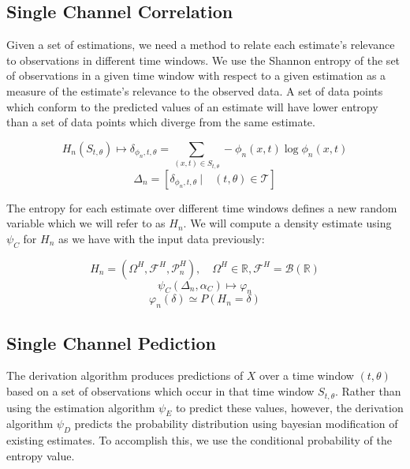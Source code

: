 \documentclass[10pt]{article}
\begin{document}
\subsection{Single Channel Correlation}


Given a set of estimations, we need a method to relate each estimate's relevance to observations in different time windows.  We use the Shannon entropy of the set of observations in a given time window with respect to a given estimation as a measure of the estimate's relevance to the observed data.  A set of data points which conform to the predicted values of an estimate will have lower entropy than a set of data points which diverge from the same estimate.

\begin{equation} \label{eq:HnSingle} H_n( S_{t,\theta} ) \mapsto \delta_{\phi_n,t,\theta} = \sum_{(x,t) \in S_{t,\theta}} -\phi_n(x,t) \log \phi_n(x,t) \end{equation}
\[ \Delta_n = [ \delta_{\phi_n,t,\theta} \ | \quad (t,\theta) \in \mathcal{T} ] \]

The entropy for each estimate over different time windows defines a new random variable which we will refer to as \( H_n \).  We will compute a density estimate using \(\psi_C \) for \( H_n \) as we have with the input data previously:

\begin{equation} \label{eq:HSingle} H_n = ( \Omega^H, \mathcal{F}^H, \mathcal{P}_n^H ), \quad \Omega^H \in \mathbb{R}, \mathcal{F}^H = \mathcal{B}(\mathbb{R}) \end{equation}
\begin{equation} \psi_C( \Delta_n , \alpha_C ) \mapsto \varphi_n \end{equation}
\begin{equation} \varphi_n(\delta) \simeq P \left( H_n = \delta \right)
\end{equation}

\subsection{Single Channel Pediction}
The derivation algorithm produces predictions of \(X \) over a time window \( (t,\theta) \) based on a set of observations which occur in that time window \(S_{t,\theta} \).  Rather than using the estimation algorithm \(\psi_E \) to predict these values, however, the derivation algorithm \(\psi_D \) predicts the probability distribution  using bayesian modification of existing estimates.  To accomplish this, we use the conditional probability of the entropy value.
\end{document}
